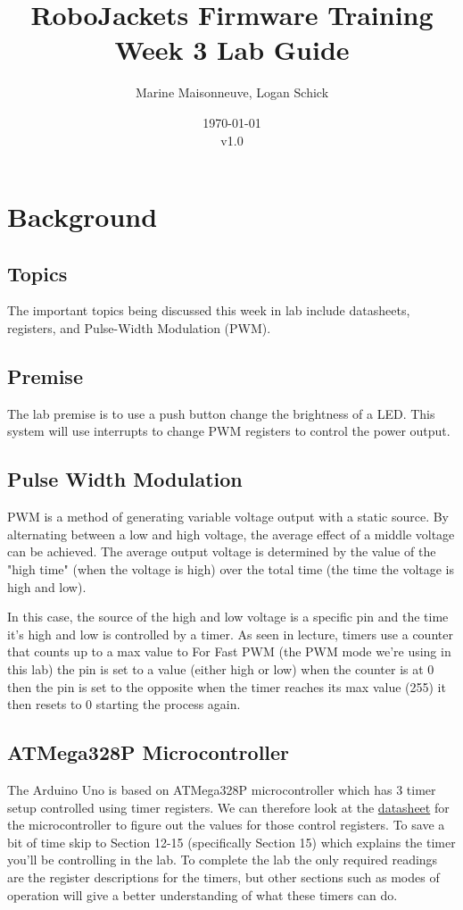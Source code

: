 \documentclass{article}
\title{RoboJackets Firmware Training Week 3 Lab Guide}
\author{Marine Maisonneuve, Logan Schick}
\date{\today\\v1.0}
\begin{document}
\maketitle{}
\setcounter{tocdepth}{2}
\tableofcontents
\pagebreak


\section{Background}
    \subsection{Topics}
        The important topics being discussed this week in lab include datasheets, registers, and Pulse-Width Modulation (PWM).
        
    \subsection{Premise}
        The lab premise is to use a push button change the brightness of a LED. This system will use interrupts to change PWM registers to control the power output.
        
    \subsection{Pulse Width Modulation}
        PWM is a method of generating variable voltage output with a static source. By alternating between a low and high voltage, the average effect of a middle voltage can be achieved. The average output voltage is determined by the value of the "high time" (when the voltage is high) over the total time (the time the voltage is high and low). 
        
        In this case, the source of the high and low voltage is a specific pin and the time it's high and low is controlled by a timer. As seen in lecture, timers use a counter that counts up to a max value to  For Fast PWM (the PWM mode we're using in this lab) the pin is set to a value (either high or low) when the counter is at 0 then the pin is set to the opposite when the timer reaches its max value (255) it then resets to 0 starting the process again. 
        
    \subsection{ATMega328P Microcontroller}
        The Arduino Uno is based on ATMega328P microcontroller which has 3 timer setup controlled using timer registers. We can therefore look at the \href{https://www.sparkfun.com/datasheets/Components/SMD/ATMega328.pdf}{datasheet} for the microcontroller to figure out the values for those control registers. To save a bit of time skip to Section 12-15 (specifically Section 15) which explains the timer you’ll be controlling in the lab. To complete the lab the only required readings are the register descriptions for the timers, but other sections such as modes of operation will give a better understanding of what these timers can do.
        
\end{document}
